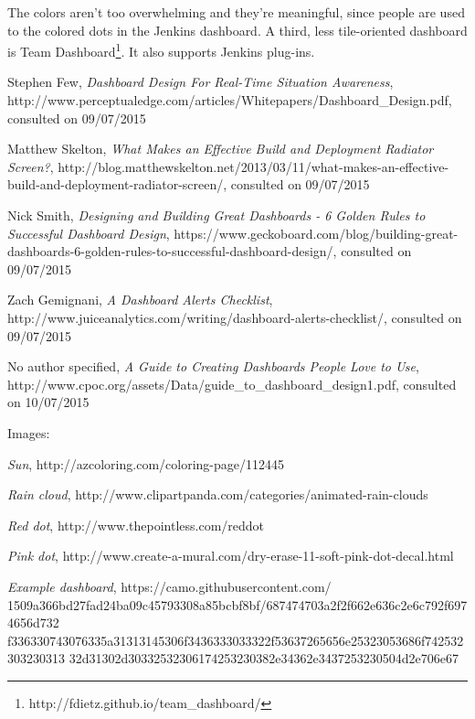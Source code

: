 \documentclass[10pt,a4paper]{article}
\begin{document}
\begin{appendices}
The colors aren’t too overwhelming and they’re meaningful, since people are used to the colored dots in the Jenkins dashboard. 
A third, less tile-oriented dashboard is Team Dashboard\footnote{http://fdietz.github.io/team\_dashboard/}. It also supports Jenkins plug-ins.


\begin{thebibliography}{11} 

 Stephen Few, \emph{Dashboard Design For Real-Time Situation Awareness}, http://www.perceptualedge.com/articles/Whitepapers/Dashboard\_Design.pdf, consulted on 09/07/2015

 Matthew Skelton, \emph{What Makes an Effective Build and Deployment Radiator Screen?}, http://blog.matthewskelton.net/2013/03/11/what-makes-an-effective-build-and-deployment-radiator-screen/, consulted on 09/07/2015

 Nick Smith, \emph{Designing and Building Great Dashboards - 6 Golden Rules to Successful Dashboard Design}, https://www.geckoboard.com/blog/building-great-dashboards-6-golden-rules-to-successful-dashboard-design/, consulted on 09/07/2015

 Zach Gemignani, \emph{A Dashboard Alerts Checklist}, http://www.juiceanalytics.com/writing/dashboard-alerts-checklist/, consulted on 09/07/2015

 No author specified, \emph{A Guide to Creating Dashboards People Love to Use}, http://www.cpoc.org/assets/Data/guide\_to\_dashboard\_design1.pdf, consulted on 10/07/2015

Images:

 \emph{Sun}, http://azcoloring.com/coloring-page/112445

 \emph{Rain cloud}, http://www.clipartpanda.com/categories/animated-rain-clouds

 \emph{Red dot}, http://www.thepointless.com/reddot

 \emph{Pink dot}, http://www.create-a-mural.com/dry-erase-11-soft-pink-dot-decal.html

 \emph{Example dashboard},  https://camo.githubusercontent.com/
1509a366bd27fad24ba09c45793308a85bcbf8bf/687474703a2f2f662e636c2e6c792f6974656d732
f336330743076335a31313145306f3436333033322f53637265656e25323053686f742532303230313
32d31302d30332532306174253230382e34362e3437253230504d2e706e67

\end{thebibliography}
\clearpage


\end{appendices}
\end{document}
